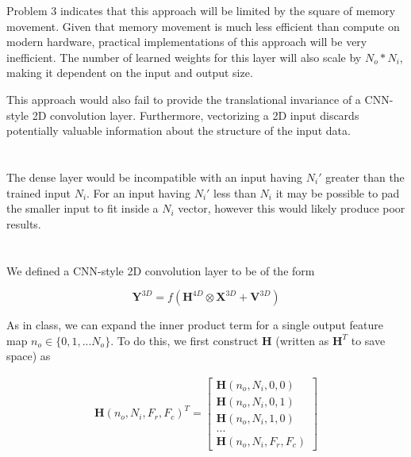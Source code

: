\documentclass[12pt]{article}
\begin{document}
Problem 3 indicates that this approach will be limited by the square of memory
movement. Given that memory movement is much less efficient than compute on
modern hardware, practical implementations of this approach will be
very inefficient. The number of learned weights for this layer will also scale
by $N_o * N_i$, making it dependent on the input and output size.
\newline

This approach would also fail to provide the translational invariance of a
CNN-style 2D convolution layer. Furthermore, vectorizing a 2D input
discards potentially valuable information about the structure of the input data.

\section{}

The dense layer would be incompatible with an input having $N_i'$ greater than
the trained input $N_i$. For an input having $N_i'$ less than $N_i$ it may be
possible to pad the smaller input to fit inside a $N_i$ vector, however this
would likely produce poor results.

\section{}

We defined a CNN-style 2D convolution layer to be of the form

\begin{equation}
	\boldsymbol{Y}^{3D} =
		f\left(\boldsymbol{H}^{4D} \otimes \boldsymbol{X}^{3D} +
		\boldsymbol{V}^{3D}\right)
\end{equation}

As in class, we can expand the inner product term for a single output feature
map $n_o \in \{0, 1, ... N_o\}$. To do this, we first construct
$\boldsymbol{H}$ (written as $\boldsymbol{H}^T$ to save space) as

\begin{align}
	\boldsymbol{H}(n_o, N_i, F_r, F_c)^T =
	\begin{bmatrix}
		\boldsymbol{H}(n_o, N_i, 0, 0) \\
		\boldsymbol{H}(n_o, N_i, 0, 1) \\
		\boldsymbol{H}(n_o,N_i, 1, 0) \\
		... \\
		\boldsymbol{H}(n_o, N_i, F_r, F_c)
	\end{bmatrix}
\end{align}
\end{document}
